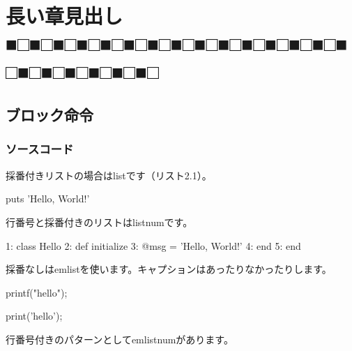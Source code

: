 \chapter{長い章見出し■□■□■□■□■□■□■□■□■□■□■□■□■□■□■□■□■□■□■□■□■□}
\label{chap:ch02}

\section{ブロック命令}
\label{sec:2-1}

\subsection{ソースコード}
\label{sec:2-1-1}

採番付きリストの場合はlistです（リスト2.1）。

\begin{reviewlistblock}
\begin{reviewlist}
puts 'Hello, World!'
\end{reviewlist}
\end{reviewlistblock}

行番号と採番付きのリストはlistnumです。


\begin{reviewlistblock}
\begin{reviewemlist}
  1: class Hello
  2:   def initialize
  3:     @msg = 'Hello, World!'
  4:   end
  5: end
\end{reviewemlist}
\end{reviewlistblock}

採番なしはemlistを使います。キャプションはあったりなかったりします。

\begin{reviewlistblock}
\begin{reviewemlist}
printf("hello");
\end{reviewemlist}
\end{reviewlistblock}


\begin{reviewlistblock}
\begin{reviewemlist}
print('hello');
\end{reviewemlist}
\end{reviewlistblock}

行番号付きのパターンとしてemlistnumがあります。

